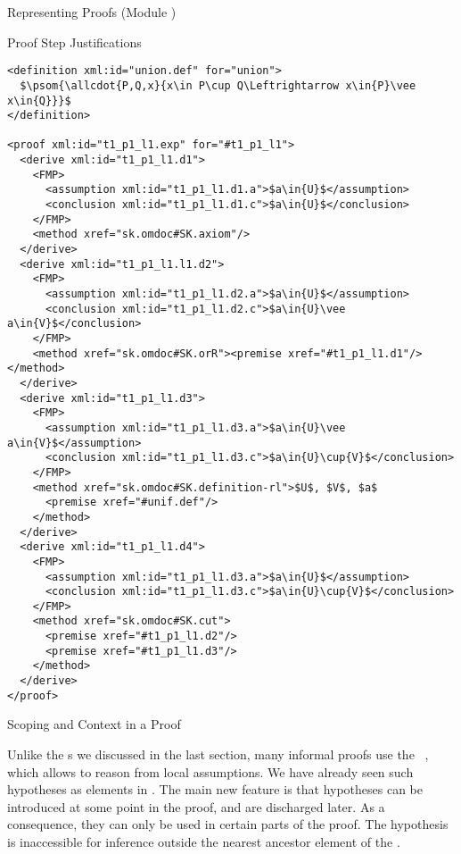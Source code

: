 \begin{omgroup}[id=proofs,short=Representing Proofs]{Representing Proofs (Module {})}
\begin{module}[id=justifications]
\begin{omgroup}[id=proofs.justifications]{Proof Step Justifications}
\begin{lstlisting}[label=lst:expansion2,mathescape,
  caption={An External Expansion of Step {\snippet{t\_1\_p1\_l1}} in {\mylstref{expansion}}},
  index={proof,derive,method,assumption,conclusion}]
<definition xml:id="union.def" for="union">
  $\psom{\allcdot{P,Q,x}{x\in P\cup Q\Leftrightarrow x\in{P}\vee x\in{Q}}}$
</definition>

<proof xml:id="t1_p1_l1.exp" for="#t1_p1_l1">
  <derive xml:id="t1_p1_l1.d1">
    <FMP>
      <assumption xml:id="t1_p1_l1.d1.a">$a\in{U}$</assumption>
      <conclusion xml:id="t1_p1_l1.d1.c">$a\in{U}$</conclusion>
    </FMP>
    <method xref="sk.omdoc#SK.axiom"/>
  </derive>
  <derive xml:id="t1_p1_l1.l1.d2">
    <FMP>
      <assumption xml:id="t1_p1_l1.d2.a">$a\in{U}$</assumption>
      <conclusion xml:id="t1_p1_l1.d2.c">$a\in{U}\vee a\in{V}$</conclusion>
    </FMP>
    <method xref="sk.omdoc#SK.orR"><premise xref="#t1_p1_l1.d1"/></method>
  </derive>
  <derive xml:id="t1_p1_l1.d3">
    <FMP>
      <assumption xml:id="t1_p1_l1.d3.a">$a\in{U}\vee a\in{V}$</assumption>
      <conclusion xml:id="t1_p1_l1.d3.c">$a\in{U}\cup{V}$</conclusion>
    </FMP>
    <method xref="sk.omdoc#SK.definition-rl">$U$, $V$, $a$
      <premise xref="#unif.def"/>
    </method>
  </derive>
  <derive xml:id="t1_p1_l1.d4">
    <FMP>
      <assumption xml:id="t1_p1_l1.d3.a">$a\in{U}$</assumption>
      <conclusion xml:id="t1_p1_l1.d3.c">$a\in{U}\cup{V}$</conclusion>
    </FMP>
    <method xref="sk.omdoc#SK.cut">
      <premise xref="#t1_p1_l1.d2"/>
      <premise xref="#t1_p1_l1.d3"/>
    </method>
  </derive>
</proof>          
\end{lstlisting}
\end{omgroup}
\end{module}

\begin{module}[id=scoping-proofs]
\begin{omgroup}[id=proofs.scoping]{Scoping and Context in a Proof}

Unlike the {s} we discussed in the last section, many
informal proofs use the ~\cite{Gentzen:uudlsiii35},
which allows to reason from local assumptions. We have already seen such hypotheses as
{} elements in {}. The main new feature is
that hypotheses can be introduced at some point in the proof, and are discharged later.
As a consequence, they can only be used in certain parts of the proof.  The hypothesis is
inaccessible for inference outside the nearest ancestor {} element of the
{}.
  

\end{omgroup}
\end{module}
\end{omgroup}
